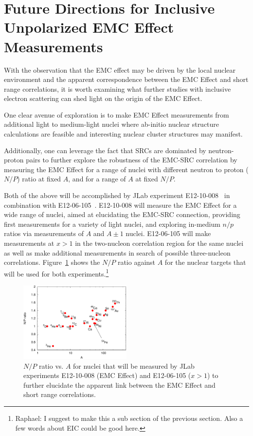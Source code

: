 \section{Future Directions for Inclusive Unpolarized EMC Effect Measurements}

With the observation that the EMC effect may be driven by the local nuclear environment
and the apparent correspondence between the EMC Effect and short range correlations, it is worth examining what
further studies with inclusive electron scattering can shed light on the origin of the EMC Effect.

One clear avenue of exploration is to make EMC Effect measurements from additional light to medium-light
nuclei where ab-initio nuclear structure calculations are feasible and interesting nuclear cluster
structures may manifest.

Additionally, one can leverage the fact that SRCs are dominated by neutron-proton pairs to further explore
the robustness of the EMC-SRC correlation by measuring the EMC Effect for a range of nuclei with
different neutron to proton ($N/P$) ratio at fixed $A$, and for a range of $A$ at fixed $N/P$.

Both of the above will be accomplished by JLab experiment E12-10-008~\cite{12gev_emc} in combination
with E12-06-105~\cite{12gev_xgt1}. E12-10-008 will measure the EMC Effect for a wide range of nuclei,
aimed at elucidating the EMC-SRC connection, providing first measurements for a variety of light nuclei,
and exploring in-medium $n/p$ ratios via measurements of $A$ and $A\pm1$ nuclei.  E12-06-105 will make
measurements at $x>1$ in the two-nucleon correlation region for the same nuclei as well as make additional
measurements in search of possible three-nucleon correlations. Figure~\ref{fig:np_ratios} shows the $N/P$
ratio against $A$ for the nuclear targets that will be used for both experiments.\footnote{Raphael: I suggest
to make this a sub section of the previous section. Also a few words about EIC could be good here.}

\begin{figure}[htb]
  \includegraphics[width=0.5\textwidth]{plots/np_ratios_2017.pdf}
  \caption{$N/P$ ratio vs. $A$ for nuclei that will be measured by JLab experiments E12-10-008 (EMC Effect)
    and E12-06-105 ($x>1$) to further elucidate the apparent link between the EMC Effect and short range
    correlations.}
  \label{fig:np_ratios}
\end{figure}
